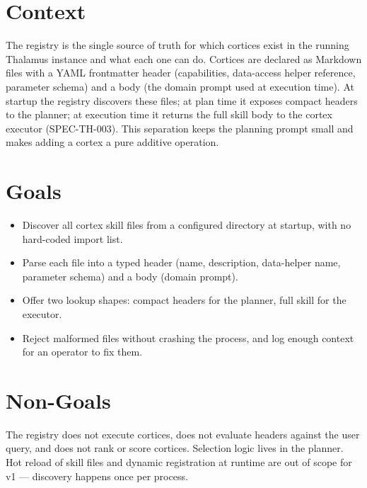 




\makespecheader

\section{Context}
The registry is the single source of truth for which cortices exist in the running Thalamus instance and what each one can do. Cortices are declared as Markdown files with a YAML frontmatter header (capabilities, data-access helper reference, parameter schema) and a body (the domain prompt used at execution time). At startup the registry discovers these files; at plan time it exposes compact headers to the planner; at execution time it returns the full skill body to the cortex executor (SPEC-TH-003). This separation keeps the planning prompt small and makes adding a cortex a pure additive operation.

\section{Goals}
\begin{itemize}[leftmargin=1.2em]
  \item Discover all cortex skill files from a configured directory at startup, with no hard-coded import list.
  \item Parse each file into a typed header (name, description, data-helper name, parameter schema) and a body (domain prompt).
  \item Offer two lookup shapes: compact headers for the planner, full skill for the executor.
  \item Reject malformed files without crashing the process, and log enough context for an operator to fix them.
\end{itemize}

\section{Non-Goals}
\begin{nongoal}
The registry does not execute cortices, does not evaluate headers against the user query, and does not rank or score cortices. Selection logic lives in the planner. Hot reload of skill files and dynamic registration at runtime are out of scope for v1 --- discovery happens once per process.
\end{nongoal}

